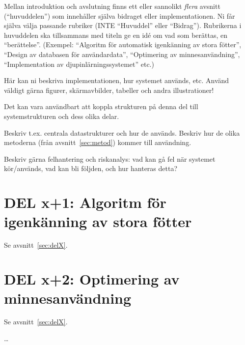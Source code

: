 \label{sec:delX}
Mellan introduktion och avslutning finns ett eller sannolikt \emph{flera} avsnitt (``huvuddelen'') som innehåller själva bidraget eller implementationen.
Ni får själva välja passande rubriker (INTE ``Huvuddel'' eller ``Bidrag'').  Rubrikerna i huvuddelen ska tillsammans med titeln ge en idé om vad som berättas, en ``berättelse''. (Exempel: ``Algoritm för automatisk igenkänning av stora fötter'', ``Design av databasen för användardata'', ``Optimering av minnesanvändning'', ``Implementation av djup\-in\-lär\-nings\-sys\-te\-met'' etc.)

Här kan ni beskriva implementationen, hur systemet används, etc. Använd väldigt gärna figurer, skärmavbilder, tabeller och andra illustrationer!

Det kan vara användbart att koppla strukturen på denna del till systemstrukturen och dess olika delar.

Beskriv t.ex. centrala datastrukturer och hur de används. Beskriv hur de olika metoderna (från avsnitt~\ref{sec:metod}) kommer till användning.

Beskriv gärna felhantering och riskanalys: vad kan gå fel när systemet kör/används, vad kan bli följden, och hur hanteras detta?

\section{DEL x+1: Algoritm för igenkänning av stora fötter}
Se avsnitt~\ref{sec:delX}.
\section{DEL x+2: Optimering av minnesanvändning}
Se avsnitt~\ref{sec:delX}.

\ldots

